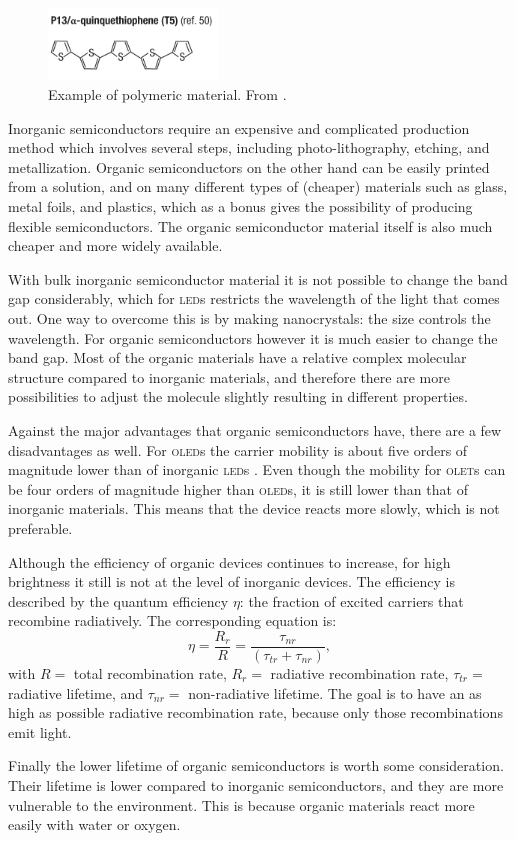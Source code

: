 \begin{figure}[!ht]
 \begin{center}
  \includegraphics[width=0.4\textwidth]{zwavelbenzeen}
  \caption{Example of polymeric material. From \citet{Muccini}.}
  \label{fig:zwavelbenzeen}
 \end{center}
\end{figure}

Inorganic semiconductors require an expensive and complicated production method which involves several steps, including photo-lithography, etching, and metallization. Organic semiconductors on the other hand can be easily printed from a solution, and on many different types of (cheaper) materials such as glass, metal foils, and plastics, which as a bonus gives the possibility of producing flexible semiconductors. The organic semiconductor material itself is also much cheaper and more widely available.

With bulk inorganic semiconductor material it is not possible to change the band gap considerably, which for \textsc{led}s restricts the wavelength of the light that comes out. One way to overcome this is by making nanocrystals: the size controls the wavelength. For organic semiconductors however it is much easier to change the band gap. Most of the organic materials have a relative complex molecular structure compared to inorganic materials, and therefore there are more possibilities to adjust the molecule slightly resulting in different properties.

Against the major advantages that organic semiconductors have, there are a few disadvantages as well. For \textsc{oled}s the carrier mobility is about five orders of magnitude lower than of inorganic \textsc{led}s \citep{Muccini}. Even though the mobility for \textsc{olet}s can be four orders of magnitude higher than \textsc{oled}s, it is still lower than that of inorganic materials. This means that the device reacts more slowly, which is not preferable.

Although the efficiency of organic devices continues to increase, for high brightness it still is not at the level of inorganic devices. The efficiency is described by the quantum efficiency $\eta$: the fraction of excited carriers that recombine radiatively. The corresponding equation is:
\[
 \eta = \frac{R_{r}}{R} = \frac{\tau_{nr}}{(\tau_{tr}+\tau_{nr})},
\]
with $R=$ total recombination rate, $R_{r}=$ radiative recombination rate, $\tau_{tr}=$ radiative lifetime, and $\tau_{nr}=$ non-radiative lifetime. The goal is to have an as high as possible radiative recombination rate, because only those recombinations emit light.

Finally the lower lifetime of organic semiconductors is worth some consideration. Their lifetime is lower compared to inorganic semiconductors, and they are more vulnerable to the environment. This is because organic materials react more easily with water or oxygen. 
